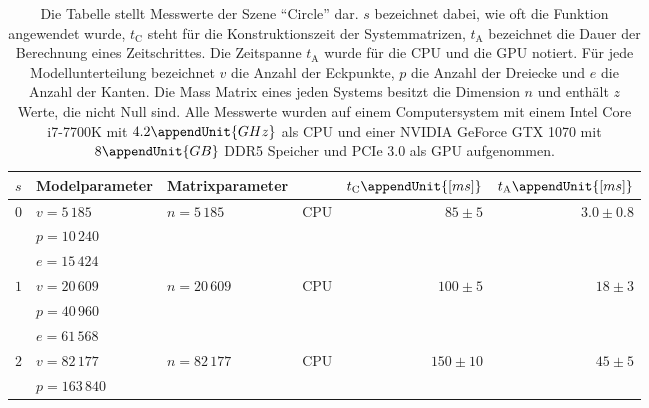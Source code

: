 \documentclass{article}
\begin{document}
    \begin{table}[h]
      \renewcommand{\arraystretch}{1.3}
      \footnotesize
      \center
      \caption{%
        Die Tabelle stellt Messwerte der Szene \enquote{Circle} dar.
        $s$ bezeichnet dabei, wie oft die Funktion  angewendet wurde, $t_\mathrm{C}$ steht für die Konstruktionszeit der Systemmatrizen, $t_\mathrm{A}$ bezeichnet die Dauer der Berechnung eines Zeitschrittes.
        Die Zeitspanne $t_\mathrm{A}$ wurde für die CPU und die GPU notiert.
        Für jede Modellunterteilung bezeichnet $v$ die Anzahl der Eckpunkte, $p$ die Anzahl der Dreiecke und $e$ die Anzahl der Kanten.
        Die Mass Matrix eines jeden Systems besitzt die Dimension $n$ und enthält $z$ Werte, die nicht Null sind.
        Alle Messwerte wurden auf einem Computersystem mit einem Intel Core i7-7700K mit $4.2\appendUnit{GHz}$ als CPU und einer NVIDIA GeForce GTX 1070 mit $8\appendUnit{GB}$ DDR5 Speicher und PCIe 3.0 als GPU aufgenommen.
      }
      \label{tab:results}
      \begin{tabular}{llllrr}
        \hline
        $s$ & Modelparameter & Matrixparameter & & $t_\mathrm{C}\appendUnit{[ms]}$ & $t_\mathrm{A}\appendUnit{[ms]}$ \\
        \hline
        \hline
        \multirow{3}{*}{$0$} & $v = 5\,185$ & \multirow{2}{*}{$n=5\,185$} & \multirow{2}{*}{CPU} & \multirow{2}{*}{$85\pm 5$} & \multirow{2}{*}{$3.0\pm 0.8$} \\
          & $p = 10\,240$ & \multirow{2}{*}{$z = 36\,033$} & \multirow{2}{*}{GPU} & \multirow{2}{*}{---} & \multirow{2}{*}{$2.35\pm 0.05$} \\
          & $e = 15\,424$ & & \\
        \hline
        \multirow{3}{*}{$1$} & $v = 20\,609$ & \multirow{2}{*}{$n=20\,609$} & \multirow{2}{*}{CPU} & \multirow{2}{*}{$100\pm 5$} & \multirow{2}{*}{$18\pm 3$} \\
          & $p = 40\,960$ & \multirow{2}{*}{$z = 143\,745$} & \multirow{2}{*}{GPU} & \multirow{2}{*}{---} & \multirow{2}{*}{$2.35\pm 0.05$} \\
          & $e = 61\,568$ & & \\
        \hline
        \multirow{3}{*}{$2$} & $v = 82\,177$ & \multirow{2}{*}{$n=82\,177$} & \multirow{2}{*}{CPU} & \multirow{2}{*}{$150\pm 10$} & \multirow{2}{*}{$45\pm 5$} \\
          & $p = 163\,840$ & \multirow{2}{*}{$z = 574\,209$} & \multirow{2}{*}{GPU} & \multirow{2}{*}{---} & \multirow{2}{*}{$2.20\pm 0.05$} \\

\end{tabular}
\end{table}
\end{document}
